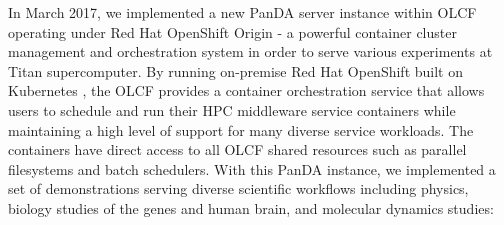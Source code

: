 In March 2017, we implemented a new PanDA server instance within OLCF operating
under Red Hat OpenShift Origin \cite{RH_OpenShift} - a powerful
container cluster management and orchestration system in order to serve various
experiments at Titan supercomputer. By running on-premise Red Hat OpenShift
built on Kubernetes \cite{Kubernetes}, the OLCF provides a container orchestration
service that allows users to schedule and run their HPC middleware service
containers while maintaining a high level of support for many diverse service
workloads. The containers have direct access to all OLCF shared resources such
as parallel filesystems and batch schedulers. With this PanDA instance, we
implemented a set of demonstrations serving diverse scientific workflows
including physics, biology studies of the genes and human brain, and molecular
dynamics studies:

